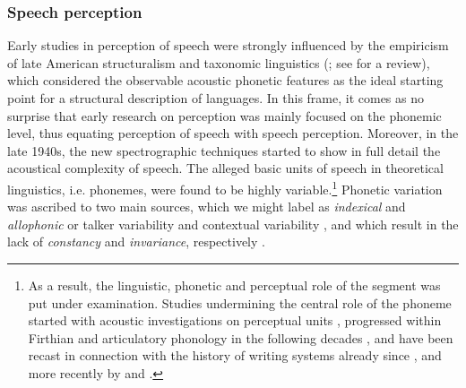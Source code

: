 \subsubsection{Speech perception}\label{sec1111}
Early studies in perception of speech were strongly influenced by the empiricism of late American structuralism and taxonomic linguistics (\citealt{harris1955phoneme, chomsky1965aspects}; see \citealt{matthews1993grammatical} for a review), which considered the observable acoustic phonetic features as the ideal starting point for a structural description of languages. In this frame, it comes as no surprise that early research on perception was mainly focused on the phonemic level, thus equating perception of speech with speech perception. Moreover, in the late 1940s, the new spectrographic techniques started to show in full detail the acoustical complexity of speech. The alleged basic units of speech in theoretical linguistics, i.e. phonemes, were found to be highly variable.\footnote{As a result, the linguistic, phonetic and perceptual role of the segment was put under examination. Studies undermining the central role of the phoneme started with acoustic investigations on perceptual units \citep{cooper1952experiments}, progressed within Firthian and articulatory phonology in the following decades \citep{firth1948prosodies,browman1986articulatory}, and have been recast in connection with the history of writing systems already since \citet{faber1992phonemic}, and more recently by \citet{albanoleoni2006statuto} and \citet{port2006graphical}.} Phonetic variation was ascribed to two main sources, which we might label as \textit{indexical} and \textit{allophonic} \citep{luce2003abstractness} or talker variability and contextual variability \citep{johnson1997complex}, and which result in the lack of \textit{constancy} and \textit{invariance}, respectively \citep{jusczyk2002speech}. 

